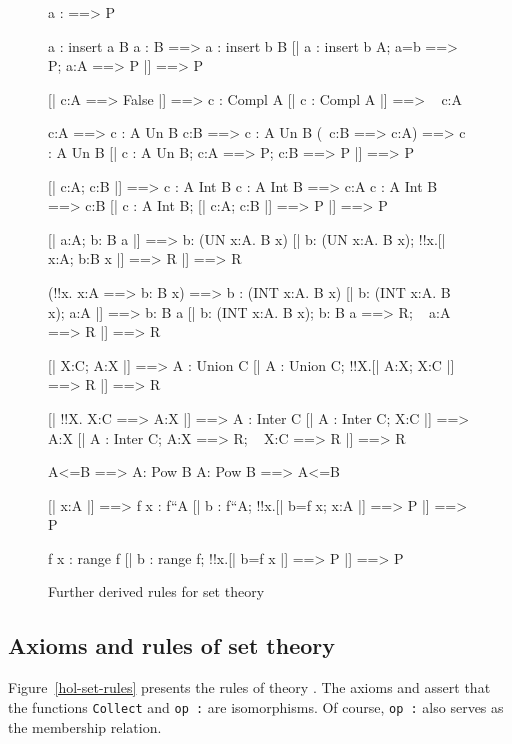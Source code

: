 \begin{figure} \underscoreon
\begin{ttbox}
   a : {\ttlbrace}{\ttrbrace} ==> P

 a : insert a B
 a : B ==> a : insert b B
  [| a : insert b A;  a=b ==> P;  a:A ==> P |] ==> P

   [| c:A ==> False |] ==> c : Compl A
   [| c : Compl A |] ==> ~ c:A

     c:A ==> c : A Un B
     c:B ==> c : A Un B
     (~c:B ==> c:A) ==> c : A Un B
      [| c : A Un B;  c:A ==> P;  c:B ==> P |] ==> P

     [| c:A;  c:B |] ==> c : A Int B
    c : A Int B ==> c:A
    c : A Int B ==> c:B
     [| c : A Int B;  [| c:A; c:B |] ==> P |] ==> P

     [| a:A;  b: B a |] ==> b: (UN x:A. B x)
     [| b: (UN x:A. B x);  !!x.[| x:A;  b:B x |] ==> R |] ==> R

    (!!x. x:A ==> b: B x) ==> b : (INT x:A. B x)
    [| b: (INT x:A. B x);  a:A |] ==> b: B a
    [| b: (INT x:A. B x);  b: B a ==> R;  ~ a:A ==> R |] ==> R

   [| X:C;  A:X |] ==> A : Union C
   [| A : Union C;  !!X.[| A:X;  X:C |] ==> R |] ==> R

   [| !!X. X:C ==> A:X |] ==> A : Inter C
   [| A : Inter C;  X:C |] ==> A:X
   [| A : Inter C;  A:X ==> R;  ~ X:C ==> R |] ==> R

     A<=B ==> A: Pow B
     A: Pow B ==> A<=B

   [| x:A |] ==> f x : f``A
   [| b : f``A;  !!x.[| b=f x;  x:A |] ==> P |] ==> P

   f x : range f
   [| b : range f;  !!x.[| b=f x |] ==> P |] ==> P
\end{ttbox}
\caption{Further derived rules for set theory} \label{hol-set2}
\end{figure}


\subsection{Axioms and rules of set theory}
Figure~\ref{hol-set-rules} presents the rules of theory .  The
axioms  and  assert
that the functions \texttt{Collect} and \hbox{\tt op :} are isomorphisms.  Of
course, \hbox{\tt op :} also serves as the membership relation.

